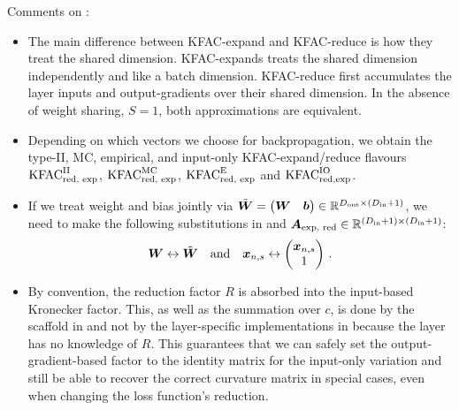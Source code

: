 Comments on :
\begin{itemize}

\item The main difference between KFAC-expand and KFAC-reduce is how they treat the shared dimension.
  KFAC-expands treats the shared dimension independently and like a batch dimension.
  KFAC-reduce first accumulates the layer inputs and output-gradients over their shared dimension.
  In the absence of weight sharing, $S=1$, both approximations are equivalent.

\item Depending on which vectors we choose for backpropagation, we obtain the type-II, MC, empirical, and input-only KFAC-expand/reduce flavours $\mathrm{KFAC}_{\text{red, exp}}^{\text{II}}$, $\mathrm{KFAC}_{\text{red, exp}}^{\text{MC}}$, $\mathrm{KFAC}_{\text{red, exp}}^{\text{E}}$ and $\mathrm{KFAC}_{\text{red,exp}}^{\text{IO}}$.

\item If we treat weight and bias jointly via $\tilde{{\bm{W}}} = \begin{pmatrix} {\bm{W}} & {\bm{b}} \end{pmatrix} \in {\mathbb{R}}^{D_{\text{out}}\times (D_{\text{in}}+1)} $, we need to make the following substitutions in  and ${\bm{A}}_{\text{exp, red}} \in {\mathbb{R}}^{(D_{\text{in}}+1) \times (D_{\text{in}}+1)}$:
  \begin{align*}
    {\bm{W}} \leftrightarrow \tilde{{\bm{W}}}
    \quad
    \text{and}
    \quad
    {\bm{x}}_{n,s} \leftrightarrow \begin{pmatrix} {\bm{x}}_{n,s} \\ 1 \end{pmatrix}\,.
  \end{align*}

\item By convention, the reduction factor $R$ is absorbed into the input-based Kronecker factor.
  This, as well as the summation over $c$, is done by the scaffold in  and not by the layer-specific implementations in  because the layer has no knowledge of $R$.
  This guarantees that we can safely set the output-gradient-based factor to the identity matrix for the input-only variation and still be able to recover the correct curvature matrix in special cases, even when changing the loss function's reduction.
\end{itemize}

